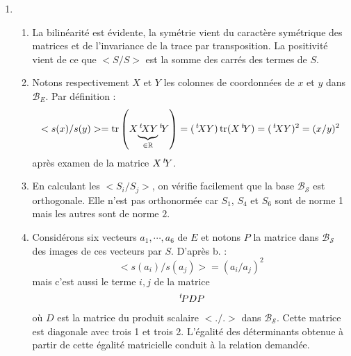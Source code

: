 \begin{enumerate}
\item \begin{enumerate}
 \item La bilinéarité est évidente, la symétrie vient du caractère symétrique des matrices et de l'invariance de la trace par transposition. La positivité vient de ce que $<S/S>$ est la somme des carrés des termes de $S$. 
\item Notons respectivement $X$ et $Y$ les colonnes de coordonnées de $x$ et $y$ dans $\mathcal B_E$. Par définition :
\begin{displaymath}
 <s(x)/s(y)>=\operatorname{tr}\left( X\underset{\in \mathbb{R}}{\underbrace{\,\mathstrut^t\! X Y}} \,\mathstrut^t\! Y\right) 
= (\,\mathstrut^t\! X Y)\operatorname{tr}(X \,\mathstrut^t\! Y) = (\,\mathstrut^t\! X Y)^2 = (x/y)^2
\end{displaymath}
après examen de la matrice $X \,\mathstrut^t\! Y$.
\item En calculant les $<S_i/S_j>$, on vérifie facilement que la base $\mathcal B_{\mathcal S}$ est orthogonale. Elle n'est pas orthonormée car $S_1$, $S_4$ et $S_6$ sont de norme 1 mais les autres sont de norme $2$.

\item Considérons six vecteurs $a_1,\cdots, a_6$ de $E$ et notons $P$ la matrice dans $\mathcal B_{\mathcal S}$ des images de ces vecteurs par $S$. D'après b. :
\begin{displaymath}
 <s(a_i)/s(a_j)> = (a_i/a_j)^2
\end{displaymath}
mais c'est aussi le terme $i,j$ de la matrice
\begin{displaymath}
 \,\mathstrut^t\! P D P
\end{displaymath}
où $D$ est la matrice du produit scalaire $<./.>$ dans $\mathcal B_{\mathcal S}$. Cette matrice est diagonale avec trois 1 et trois 2. L'égalité des déterminants obtenue à partir de cette égalité matricielle conduit à la relation demandée.
\end{enumerate}

\end{enumerate}
